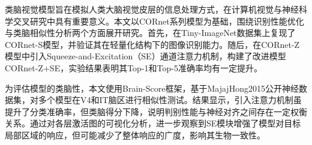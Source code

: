 \begin{abstractzh}

类脑视觉模型旨在模拟人类大脑视觉皮层的信息处理方式，在计算机视觉与神经科学交叉研究中具有重要意义。本文以CORnet系列模型为基础，围绕识别性能优化与类脑相似性分析两个方面展开研究。首先，在Tiny-ImageNet数据集上复现了CORnet-S模型，并验证其在轻量化结构下的图像识别能力。随后，在CORnet-Z模型中引入Squeeze-and-Excitation（SE）通道注意力机制，构建了改进模型CORnet-Z+SE，实验结果表明其Top-1和Top-5准确率均有一定提升。

为评估模型的类脑性，本文使用Brain-Score框架，基于MajajHong2015公开神经数据集，对多个模型在V4和IT脑区进行相似性测试。结果显示，引入注意力机制虽提升了分类准确率，但类脑得分下降，说明判别性能与神经对齐之间存在一定权衡关系。通过对各层激活图的可视化分析，进一步观察到SE模块增强了模型对目标局部区域的响应，但可能减少了整体响应的广度，影响其生物一致性。


\end{abstractzh}

